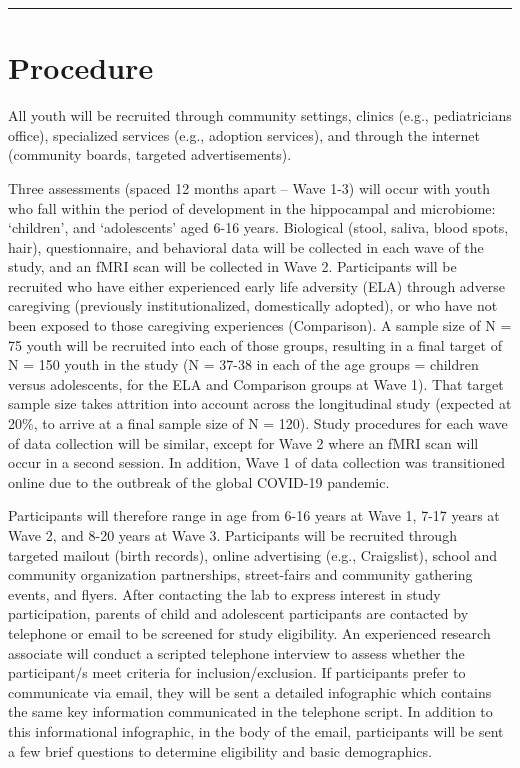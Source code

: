 \documentclass[]{book}
\begin{document}
\begin{center}\rule{0.5\linewidth}{0.5pt}\end{center}

\hypertarget{procedure}{%
\section{Procedure}\label{procedure}}

All youth will be recruited through community settings, clinics (e.g., pediatricians office), specialized services (e.g., adoption services), and through the internet (community boards, targeted advertisements).

Three assessments (spaced 12 months apart -- Wave 1-3) will occur with youth who fall within the period of development in the hippocampal and microbiome: `children', and `adolescents' aged 6-16 years. Biological (stool, saliva, blood spots, hair), questionnaire, and behavioral data will be collected in each wave of the study, and an fMRI scan will be collected in Wave 2. Participants will be recruited who have either experienced early life adversity (ELA) through adverse caregiving (previously institutionalized, domestically adopted), or who have not been exposed to those caregiving experiences (Comparison). A sample size of N = 75 youth will be recruited into each of those groups, resulting in a final target of N = 150 youth in the study (N = 37-38 in each of the age groups = children versus adolescents, for the ELA and Comparison groups at Wave 1). That target sample size takes attrition into account across the longitudinal study (expected at 20\%, to arrive at a final sample size of N = 120). Study procedures for each wave of data collection will be similar, except for Wave 2 where an fMRI scan will occur in a second session. In addition, Wave 1 of data collection was transitioned online due to the outbreak of the global COVID-19 pandemic.

Participants will therefore range in age from 6-16 years at Wave 1, 7-17 years at Wave 2, and 8-20 years at Wave 3. Participants will be recruited through targeted mailout (birth records), online advertising (e.g., Craigslist), school and community organization partnerships, street-fairs and community gathering events, and flyers. After contacting the lab to express interest in study participation, parents of child and adolescent participants are contacted by telephone or email to be screened for study eligibility. An experienced research associate will conduct a scripted telephone interview to assess whether the participant/s meet criteria for inclusion/exclusion. If participants prefer to communicate via email, they will be sent a detailed infographic which contains the same key information communicated in the telephone script. In addition to this informational infographic, in the body of the email, participants will be sent a few brief questions to determine eligibility and basic demographics.
\end{document}
